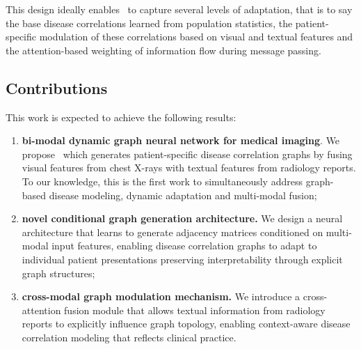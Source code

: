 \documentclass[
  journal=noname,
  manuscript=draft,
  year=,
  volume=,
]{cup-journal}
\begin{document}
This design ideally enables \mm\, to capture several levels of adaptation, that is to say 
the base disease correlations learned from population statistics, 
the patient-specific modulation of these correlations based on 
visual and textual features and the attention-based weighting of 
information flow during message passing.

\subsection{Contributions}

This work is expected to achieve the following results:

\begin{enumerate}
\item \textbf{bi-modal dynamic graph neural network for medical 
imaging}. We propose \mm\, which generates patient-specific disease 
correlation graphs by fusing visual features from chest X-rays with 
textual features from radiology reports. To our knowledge, this is the 
first work to simultaneously address graph-based disease modeling, 
dynamic adaptation and multi-modal fusion;

\item \textbf{novel conditional graph generation architecture.} We 
design a neural architecture that learns to generate adjacency matrices 
conditioned on multi-modal input features, enabling disease correlation 
graphs to adapt to individual patient presentations preserving 
interpretability through explicit graph structures;

\item \textbf{cross-modal graph modulation mechanism.} We introduce a 
cross-attention fusion module that allows textual information from 
radiology reports to explicitly influence graph topology, enabling 
context-aware disease correlation modeling that reflects clinical 
practice.


\end{enumerate}
\end{document}
